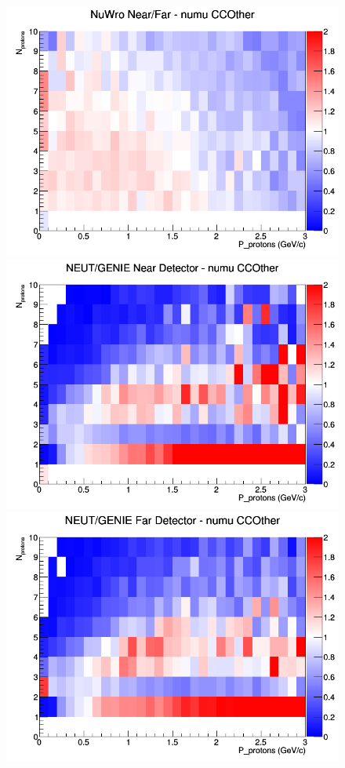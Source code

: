 \begin{figure}[h]
\endminipage
{}
\includegraphics[width=\linewidth]{N_P/nominal/protons/ratios/CCOther_NuWro_numu_NF_N_P.png}
\endminipage
\newline
{}
\includegraphics[width=\linewidth]{N_P/nominal/protons/ratios/CCOther_NEUT_GENIE_numu_near_N_P.png}
\endminipage
{}
\includegraphics[width=\linewidth]{N_P/nominal/protons/ratios/CCOther_NEUT_GENIE_numu_far_N_P.png}

\end{figure}
